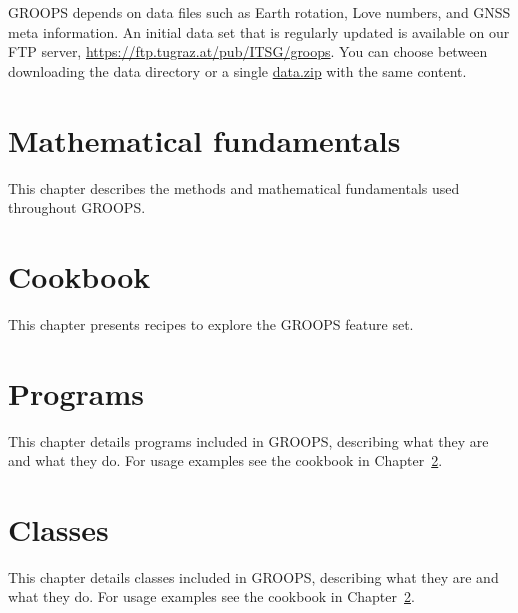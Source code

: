 \documentclass[10pt,twoside,titlepage]{report}
\begin{document}
GROOPS depends on data files such as Earth rotation, Love numbers, and GNSS meta information.
An initial data set that is regularly updated is available on our FTP server,
\url{https://ftp.tugraz.at/pub/ITSG/groops}. You can choose between downloading the data directory
or a single \href{https://ftp.tugraz.at/pub/ITSG/groops/data.zip}{data.zip} with the same content.


\clearpage

\clearpage

\clearpage

\clearpage

\clearpage

\clearpage


\clearpage

\chapter{Mathematical fundamentals}
This chapter describes the methods and mathematical fundamentals used throughout GROOPS.

\clearpage

\clearpage


\chapter{Cookbook}\label{general.cookbook}
This chapter presents recipes to explore the GROOPS feature set.

\clearpage

\clearpage

\clearpage

\clearpage

\clearpage

\clearpage


\chapter{Programs}\label{programType}
This chapter details programs included in GROOPS, describing what they are and what they do. For usage examples see the cookbook in Chapter~\ref{general.cookbook}.


\chapter{Classes}\label{classes}
This chapter details classes included in GROOPS, describing what they are and what they do. For usage examples see the cookbook in Chapter~\ref{general.cookbook}.

\end{document}
